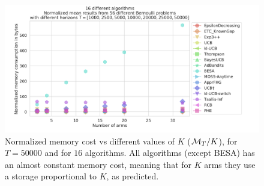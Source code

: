 \begin{figure}[h!]  %
	\includegraphics[width=1.10\linewidth]{16_different_algorithms__normmemory_vs_arms__56pb__7Ks_T50000.pdf}
	\caption[Normalized memory cost vs different values of $K$.]{
        Normalized memory cost vs different values of $K$ ($\mathcal{M}_T / K$),
        for $T=50000$ and for $16$ algorithms.
        All algorithms (except BESA) has an almost constant memory cost, meaning that for $K$ arms they use a storage proportional to $K$, as predicted.
	}
	\label{fig:3:16_different_algorithms__normmemory_vs_arms__56pb__7Ks_T50000}
\end{figure}

